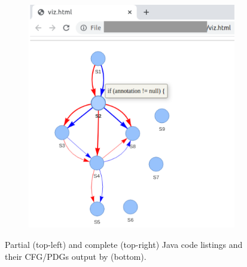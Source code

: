 \begin{figure}[hbt!]
\begin{subfigure}[b]{.45\textwidth}
  \centering
  \includegraphics[width=0.7\linewidth]{icse23-demo-figures/lst-complete2.png}
\end{subfigure}
\caption{Partial (top-left) and complete (top-right) Java code listings and their CFG/PDGs output by \tool (bottom).}
\label{fig:demo}
\end{figure}